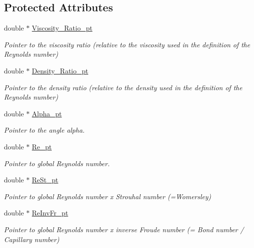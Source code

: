 \subsection*{Protected Attributes}
\begin{DoxyCompactItemize}
\item 
double $\ast$ \hyperlink{classoomph_1_1PolarNavierStokesEquations_a24e640611fdce1c8edf25a20f2cf04be}{Viscosity\+\_\+\+Ratio\+\_\+pt}
\begin{DoxyCompactList}\small\item\em Pointer to the viscosity ratio (relative to the viscosity used in the definition of the Reynolds number) \end{DoxyCompactList}\item 
double $\ast$ \hyperlink{classoomph_1_1PolarNavierStokesEquations_aaa473c798179654d1e82e3aaf795fbd4}{Density\+\_\+\+Ratio\+\_\+pt}
\begin{DoxyCompactList}\small\item\em Pointer to the density ratio (relative to the density used in the definition of the Reynolds number) \end{DoxyCompactList}\item 
double $\ast$ \hyperlink{classoomph_1_1PolarNavierStokesEquations_af11f78588280776bd58d687c63c5dfe4}{Alpha\+\_\+pt}
\begin{DoxyCompactList}\small\item\em Pointer to the angle alpha. \end{DoxyCompactList}\item 
double $\ast$ \hyperlink{classoomph_1_1PolarNavierStokesEquations_a85eeb2e2f741b04f0d81501bf44109f8}{Re\+\_\+pt}
\begin{DoxyCompactList}\small\item\em Pointer to global Reynolds number. \end{DoxyCompactList}\item 
double $\ast$ \hyperlink{classoomph_1_1PolarNavierStokesEquations_a214463c8a9f3ea75dd68495d33906ff3}{Re\+St\+\_\+pt}
\begin{DoxyCompactList}\small\item\em Pointer to global Reynolds number x Strouhal number (=Womersley) \end{DoxyCompactList}\item 
double $\ast$ \hyperlink{classoomph_1_1PolarNavierStokesEquations_ab75185b504baf9b685fbdc7b22bec68f}{Re\+Inv\+Fr\+\_\+pt}
\begin{DoxyCompactList}\small\item\em Pointer to global Reynolds number x inverse Froude number (= Bond number / Capillary number) \end{DoxyCompactList}\item 

\end{DoxyCompactItemize}
